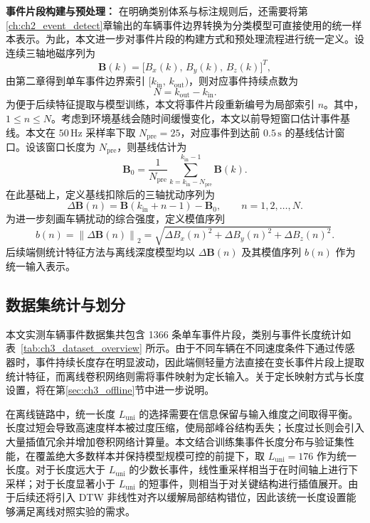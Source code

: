 \noindent\textbf{事件片段构建与预处理：}
在明确类别体系与标注规则后，还需要将第\ref{ch:ch2_event_detect}章输出的车辆事件边界转换为分类模型可直接使用的统一样本表示。为此，本文进一步对事件片段的构建方式和预处理流程进行统一定义。设连续三轴地磁序列为
\begin{equation}
    \mathbf{B}(k)=\big[B_x(k),\,B_y(k),\,B_z(k)\big]^T,
\end{equation}
由第二章得到单车事件边界索引 $[k_{\mathrm{in}},\,k_{\mathrm{out}})$，则对应事件持续点数为
\begin{equation}
    N=k_{\mathrm{out}}-k_{\mathrm{in}}.
\end{equation}
为便于后续特征提取与模型训练，本文将事件片段重新编号为局部索引 $n$。其中，$1\le n\le N$。考虑到环境基线会随时间缓慢变化，本文以前导短窗口估计事件基线。本文在 $50\,\mathrm{Hz}$ 采样率下取 $N_{\mathrm{pre}}=25$，对应事件到达前 $0.5\,\mathrm{s}$ 的基线估计窗口。设该窗口长度为 $N_{\mathrm{pre}}$，则基线估计为
\begin{equation}
    \mathbf{B}_0=\frac{1}{N_{\mathrm{pre}}}\sum_{k=k_{\mathrm{in}}-N_{\mathrm{pre}}}^{k_{\mathrm{in}}-1}\mathbf{B}(k).
\end{equation}
在此基础上，定义基线扣除后的三轴扰动序列为
\begin{equation}
    \Delta\mathbf{B}(n)=\mathbf{B}(k_{\mathrm{in}}+n-1)-\mathbf{B}_0,\qquad n=1,2,\ldots,N.
\end{equation}
为进一步刻画车辆扰动的综合强度，定义模值序列
\begin{equation}
    b(n)=\left\|\Delta\mathbf{B}(n)\right\|_2
    =\sqrt{\Delta B_x(n)^2+\Delta B_y(n)^2+\Delta B_z(n)^2}.
\end{equation}
后续端侧统计特征方法与离线深度模型均以 $\Delta\mathbf{B}(n)$ 及其模值序列 $b(n)$ 作为统一输入表示。

\subsection{数据集统计与划分}
\label{subsec:ch3_split_term}

本文实测车辆事件数据集共包含 1366 条单车事件片段，类别与事件长度统计如表~\ref{tab:ch3_dataset_overview} 所示。由于不同车辆在不同速度条件下通过传感器时，事件持续长度存在明显波动，因此端侧轻量方法直接在变长事件片段上提取统计特征，而离线卷积网络则需将事件映射为定长输入。关于定长映射方式与长度设置，将在第\ref{sec:ch3_offline}节中进一步说明。

在离线链路中，统一长度 $L_{\mathrm{uni}}$ 的选择需要在信息保留与输入维度之间取得平衡。长度过短会导致高速度样本被过度压缩，使局部峰谷结构丢失；长度过长则会引入大量插值冗余并增加卷积网络计算量。本文结合训练集事件长度分布与验证集性能，在覆盖绝大多数样本并保持模型规模可控的前提下，取 $L_{\mathrm{uni}}=176$ 作为统一长度。对于长度远大于 $L_{\mathrm{uni}}$ 的少数长事件，线性重采样相当于在时间轴上进行下采样；对于长度显著小于 $L_{\mathrm{uni}}$ 的短事件，则相当于对关键结构进行插值展开。由于后续还将引入 DTW 非线性对齐以缓解局部结构错位，因此该统一长度设置能够满足离线对照实验的需求。

